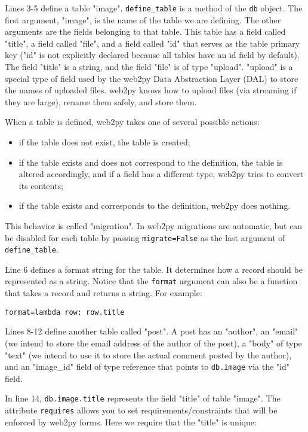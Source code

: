 \documentclass[justified,sixbynine,notoc]{tufte-book}
\def\ft{\small\tt}
\begin{document}
\begin{fullwidth}
Lines 3-5 define a table "image". {\ft define\_table} is a method of the {\ft db} object. The first argument, "image", is the name of the table we are defining. The other arguments are the fields belonging to that table. This table has a field called "title", a field called "file", and a field called "id" that serves as the table primary key ("id" is not explicitly declared because all tables have an id field by default). The field "title" is a string, and the field "file" is of type "upload". "upload" is a special type of field used by the web2py Data Abstraction Layer (DAL) to store the names of uploaded files. web2py knows how to upload files (via streaming if they are large), rename them safely, and store them.

When a table is defined, web2py takes one of several possible actions:
\begin{itemize}
\item if the table does not exist, the table is created;

\item if the table exists and does not correspond to the definition, the table is altered accordingly, and if a field has a different type, web2py tries to convert its contents;

\item if the table exists and corresponds to the definition, web2py does nothing.
\end{itemize}

This behavior is called "migration". In web2py migrations are automatic, but can be disabled for each table by passing {\ft migrate=False} as the last argument of {\ft define\_table}.

Line 6 defines a format string for the table. It determines how a record should be represented as a string. Notice that the {\ft format} argument can also be a function that takes a record and returns a string. For example:

\begin{lstlisting}
format=lambda row: row.title
\end{lstlisting}

Lines 8-12 define another table called "post".
A post has an "author", an "email" (we intend to store the email address of the author of the post), a "body" of type "text" (we intend to use it to store the actual comment posted by the author), and an "image\_id" field of type reference that points to {\ft db.image} via the "id" field.

In line 14, {\ft db.image.title} represents the field "title" of table "image". The attribute {\ft requires} allows you to set requirements/constraints that will be enforced by web2py forms. Here we require that the "title" is unique:


\end{fullwidth}
\end{document}
